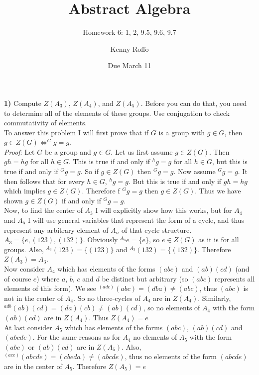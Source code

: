 \documentclass{scrartcl}
\title{Abstract Algebra}
\subtitle{Homework 6: 1, 2, 9.5, 9.6, 9.7}
\author{Kenny Roffo}
\date{Due March 11}
\begin{document}
\maketitle

\textbf{1)} Compute $Z(A_3)$, $Z(A_4)$, and $Z(A_5)$. Before you can do that, you need to determine all of the elements of these groups. Use conjugation to check commutativity of elements.\\

To answer this problem I will first prove that if $G$ is a group with $g \in G$, then $g \in Z(G) \iff ^Gg={g}$.\\

\emph{Proof}: Let $G$ be a group and $g \in G$. Let us first assume $g \in Z(G)$. Then $gh=hg$ for all $h \in G$. This is true if and only if $^hg=g$ for all $h \in G$, but this is true if and only if $^Gg={g}$. So if $g \in Z(G)$ then $^Gg={g}$. Now assume $^Gg={g}$. It then follows that for every $h \in G$, $^hg=g$. But this is true if and only if $gh=hg$ which implies $g \in Z(G)$. Therefore f $^Gg={g}$ then $g \in Z(G)$. Thus we have shown $g \in Z(G)$ if and only if $^Gg={g}$.\\

Now, to find the center of $A_3$ I will explicitly show how this works, but for $A_4$ and $A_5$ I will use general variables that represent the form of a cycle, and thus represent any arbitrary element of $A_n$ of that cycle structure.\\

$A_3=\{e,(123),(132)\}$. Obviously $^{A_3}e=\{e\}$, so $e \in Z(G)$ as it is for all groups. Also, $^{A_3}(123)=\{(123)\}$ and $^{A_3}(132)=\{(132)\}$. Therefore $Z(A_3)=A_3$.\\

Now consider $A_4$ which has elements of the forms $(abc)$ and $(ab)(cd)$ (and of course $e$) where $a$, $b$, $c$ and $d$ be distinct but arbitrary (so $(abc)$ represents all elements of this form). We see $^{(adc)}(abc)=(dba)\ne (abc)$, thus $(abc)$ is not in the center of $A_4$. So no three-cycles of $A_4$ are in $Z(A_4)$. Similarly, $^{adb}(ab)(cd)=(da)(cb)\ne(ab)(cd)$, so no elements of $A_4$ with the form $(ab)(cd)$ are in $Z(A_4)$. Thus $Z(A_4)={e}$\\

At last consider $A_5$ which has elements of the forms $(abc)$, $(ab)(cd)$ and $(abcde)$. For the same reasons as for $A_4$ no elements of $A_5$ with the form $(abc)$ or $(ab)(cd)$ are in $Z(A_5)$. Also, $^{(ace)}(abcde)=(cbeda) \ne (abcde)$, thus no elements of the form $(abcde)$ are in the center of $A_5$. Therefore $Z(A_5)={e}$\pagebreak
\end{document}
